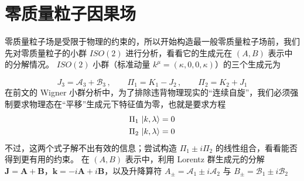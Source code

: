 \section{零质量粒子因果场}\label{sec:massless_fields}
零质量粒子场是受限于物理的约束的，所以开始构造最一般零质量粒子场前，我们先对零质量粒子的小群 $ISO(2)$ 进行分析，看看它的生成元在 $(A,B)$ 表示中的分解情况。
$ISO(2)$ 小群（标准动量 $k^\mu=(\kappa,0,0,\kappa)$）的三个生成元为

\begin{equation}
    J_3= \mathcal{A}_3 + \mathcal{B}_3\,,\qquad \Pi_1 = K_1 - J_2\,,\qquad \Pi_2 = K_2 + J_1
\end{equation}
在前文的 Wigner 小群分析中，为了排除违背物理现实的“连续自旋”，我们必须强制要求物理态在“平移”生成元下特征值为零，也就是要求方程 
\begin{subequations}
    \begin{align}
        \Pi_1 \, \Ket{k,\lambda} &= 0 \\
        \Pi_2 \, \Ket{k,\lambda} &= 0
    \end{align}
\end{subequations}
不过，这两个式子解不出有效的信息；尝试构造 $\Pi_1 \pm i\Pi_2$ 的线性组合，看看能否得到更有用的约束。
在 $(A,B)$ 表示中，利用 Lorentz 群生成元的分解 $\mathbf{J} = \mathbf{A} + \mathbf{B}$，$\boldsymbol{k} = -i\mathbf{A} + i\mathbf{B}$，以及升降算符 $A_\pm = \mathcal{A}_1 \pm i\mathcal{A}_2$ 与 $B_\pm = \mathcal{B}_1 \pm i\mathcal{B}_2$
